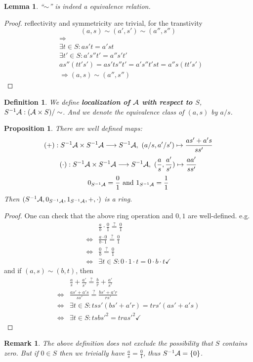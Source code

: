 \documentclass[11pt]{article}
\newtheorem{prop}[thm]{Proposition}
\newtheorem{lemma}[thm]{Lemma}
\newtheorem{dfn}[thm]{Definition}
\newtheorem{rmk}[thm]{Remark}
\newcommand{\cala}{{\cal A}}
\newcommand{\Lrta}{\Longrightarrow}
\newcommand{\lrta}{\longrightarrow}
\newcommand{\Llrta}{\Longleftrightarrow}
\begin{document}
\begin{lemma}
``$\sim$'' is indeed a equivalence relation.
\end{lemma}
\begin{proof}
reflectivity and symmetricity are trivial, for the transtivity
$$
(a,s)\sim(a',s')\sim (a'',s'')
$$
$$
\begin{aligned}
&\Lrta\\
&\exists t\in S: as't=a's t\\
& \exists t'\in S: a's'' t'=a''s't'\\
&as''(tt's')=as'ts''t'=a's''t's t=a''s (t t's')\\
& \Lrta (a,s)\sim(a'',s'')
\end{aligned}
$$
\end{proof}
\begin{dfn}
We define \textbf{localization of $\cala$ with respect to $S$}, 
$S^{-1}\cala:(\cala\times S)/\sim$.  And we denote the equivalence class of $(a,s)$ by $a/s$.
\end{dfn}
\begin{prop}
There are well defined maps:
$$
(+):S^{-1}\cala\times S^{-1}\cala\lrta S^{-1}\cala,\ (a/s,a'/s')\mapsto \frac{as'+a's}{ss'}
$$
$$
(\cdot):S^{-1}\cala\times S^{-1}\cala\lrta S^{-1}\cala,\ (\frac{a}{s},\frac{a'}{s'})\mapsto \frac{aa'}{ss'}
$$
$$
0_{S^{-1}\cala}=\frac{0}{1}\text{ and } 1_{S^{-1}\cala}=\frac{1}{1}
$$
Then $(S^{-1}\cala,0_{S^{-1}\cala},1_{S^{-1}\cala},+,\cdot)$ is a ring.
\end{prop}
\begin{proof}
One can check that the above ring operation and $0,1$ are well-defined. e.g.\\
$$
\begin{aligned}
&\frac{a}{b}\cdot\frac{0}{1}\overset{?}{=}\frac{0}{1}\\
\Llrta & \frac{a\cdot 0}{b\cdot 1}\overset{?}{=}\frac{0}{1}\\
\Llrta & \frac{0}{b}\overset{?}{=}\frac{0}{1}\\
\Llrta &\exists t\in S: 0\cdot 1\cdot t=0\cdot b\cdot t\checkmark
\end{aligned}
$$
and if $(a,s)\sim (b,t)$, then
$$
\begin{aligned}
&\frac{a}{s}+\frac{a'}{s'}\overset{?}{=}\frac{b}{r}+\frac{a'}{s'}\\
\Llrta &\frac{as'+a's}{ss'}\overset{?}{=}\frac{bs'+a'r}{rs'}\\
\Llrta & \exists t\in S: tss'(bs'+a'r)=trs'(as'+a's)\\
\Llrta & \exists t\in S: tsbs'^2=tras'^2\checkmark
\end{aligned}
$$

\end{proof}
\begin{rmk}
The above definition does not exclude the possibility that $S$ contains zero. But if $0\in S$ then we trivially have $\frac{a}{s}=\frac{0}{1}$, thus $S^{-1}\cala=\{0\}$.
\end{rmk}
\end{document}
